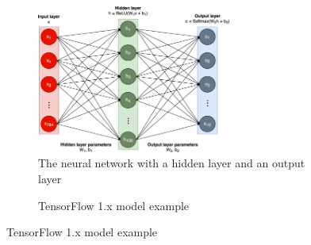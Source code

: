 \begin{figure}\centering
    \begin{subfigure}[b]{1\textwidth}
        \centering
        \includegraphics[width=0.7\textwidth]{Fig1.eps}
        \caption{The neural network with a hidden layer and an output layer}
        \label{fig:back:model}
    \end{subfigure}
    
    \begin{subfigure}[b]{1\textwidth}
        
        \caption{TensorFlow 1.x model example}
        \label{fig:back:tf1}
    \end{subfigure}   
\end{figure}


